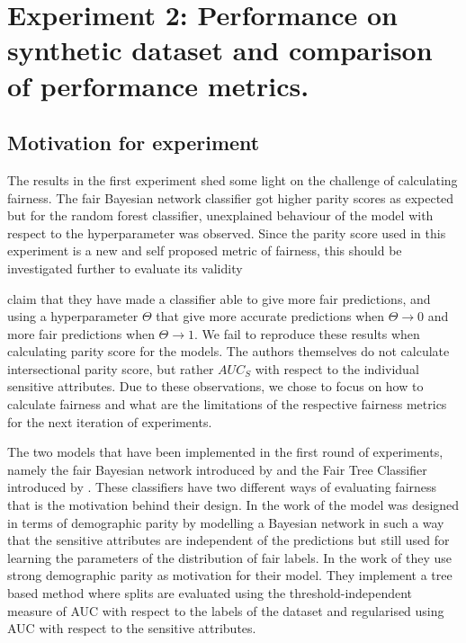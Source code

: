 \section{Experiment 2: Performance on synthetic dataset and comparison of performance metrics.}

\subsection{Motivation for experiment}

The results in the first experiment shed some light on the challenge of calculating fairness. The fair Bayesian network classifier got higher parity scores as expected but for the random forest classifier, unexplained behaviour of the model with respect to the hyperparameter was observed. Since the parity score used in this experiment is a new and self proposed metric of fairness, this should be investigated further to evaluate its validity

\citet{Antonio:2021:arXiv} claim that they have made a classifier able to give more fair predictions, and using a hyperparameter $\Theta$ that give more accurate predictions when $\Theta \rightarrow 0$ and more fair predictions when $\Theta \rightarrow 1$. We fail to reproduce these results when calculating parity score for the models. The authors themselves do not calculate intersectional parity score, but rather $AUC_S$ with respect to the individual sensitive attributes. Due to these observations, we chose to focus on how to calculate fairness and what are the limitations of the respective fairness metrics for the next iteration of experiments.

The two models that have been implemented in the first round of experiments, namely the fair Bayesian network introduced by \citet{Choi:2021:AIII} and the Fair Tree Classifier introduced by \citet{Antonio:2021:arXiv}. These classifiers have two different ways of evaluating fairness that is the motivation behind their design. In the work of \citet{Choi:2021:AIII} the model was designed in terms of demographic parity by modelling a Bayesian network in such a way that the sensitive attributes are independent of the predictions but still used for learning the parameters of the distribution of fair labels. In the work of \citet{Antonio:2021:arXiv} they use strong demographic parity as motivation for their model. They implement a tree based method where splits are evaluated using the threshold-independent measure of AUC with respect to the labels of the dataset and  regularised using AUC with respect to the sensitive attributes. 

